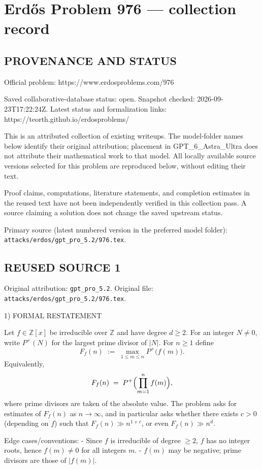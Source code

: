 \section*{Erd\H{o}s Problem 976 --- collection record}

\subsection*{PROVENANCE AND STATUS}
Official problem: https://www.erdosproblems.com/976

Saved collaborative-database status: open.
Snapshot checked: 2026-09-23T17:22:24Z.
Latest status and formalization links: https://teorth.github.io/erdosproblems/

This is an attributed collection of existing writeups. The model-folder names below identify their original attribution; placement in GPT\_6\_Astra\_Ultra does not attribute their mathematical work to that model. All locally available source versions selected for this problem are reproduced below, without editing their text.

Proof claims, computations, literature statements, and completion estimates in the reused text have not been independently verified in this collection pass. A source claiming a solution does not change the saved upstream status.

Primary source (latest numbered version in the preferred model folder): \texttt{attacks/erdos/gpt\_pro\_5.2/976.tex}.

\subsection*{REUSED SOURCE 1}
Original attribution: \texttt{gpt\_pro\_5.2}.
Original file: \texttt{attacks/erdos/gpt\_pro\_5.2/976.tex}.



1) FORMAL RESTATEMENT

Let $f\in\mathbb Z[x]$ be irreducible over $\mathbb Z$ and have degree $d\ge 2$.
For an integer $N\ne 0$, write $P^+(N)$ for the largest prime divisor of $|N|$.
For $n\ge 1$ define
\[
F_f(n)\;:=\;\max_{1\le m\le n} P^+\bigl(f(m)\bigr).
\]
Equivalently,
\[
F_f(n)\;=\; P^+\Bigl(\prod_{m=1}^n f(m)\Bigr),
\]
where prime divisors are taken of the absolute value.
The problem asks for estimates of $F_f(n)$ as $n\to\infty$, and in particular asks whether
there exists $c>0$ (depending on $f$) such that $F_f(n)\gg n^{1+c}$, or even $F_f(n)\gg n^d$.

Edge cases/conventions:
- Since $f$ is irreducible of degree $\ge 2$, $f$ has no integer roots, hence $f(m)\ne 0$ for all integers $m$.
- $f(m)$ may be negative; prime divisors are those of $|f(m)|$.

